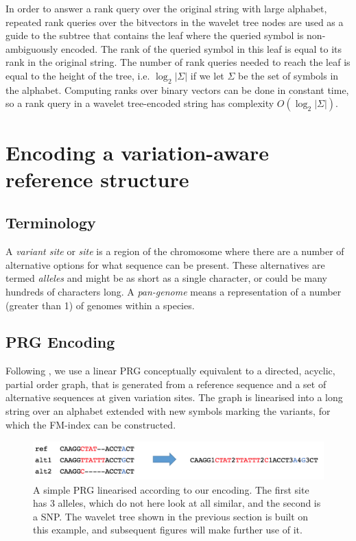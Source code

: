 \documentclass[runningheads,a4paper]{llncs}
\begin{document}
In order to answer a rank query over the original string with large alphabet, repeated rank queries over the bitvectors in the wavelet tree nodes are used as a guide to the  subtree that contains the leaf where the queried symbol is non-ambiguously encoded. The rank of the queried symbol in this leaf is equal to its rank in the original string. The number of rank queries needed to reach the leaf is equal to the height of the tree, i.e. $\log_{2} {|\Sigma|}$ if we let $\Sigma$ be the set of symbols in the alphabet. Computing ranks over binary vectors can be done in constant time, so a rank query in a wavelet tree-encoded string has complexity $O(\log_{2} {|\Sigma|})$. 

\section{Encoding a variation-aware reference structure}

\subsection{Terminology}
A \textit{variant site} or \textit{site} is a region of the chromosome where there are a number of alternative options for what sequence can be present.
These alternatives are termed \textit{alleles} and might be as short as a single character, or could be many hundreds of characters long. A  \textit{pan-genome} means a representation of a number (greater than 1) of genomes within a species. 

\subsection{PRG Encoding}



Following \cite{dilthey}, we use a linear PRG conceptually equivalent to a directed, acyclic, partial order graph, that is generated from a reference sequence and a set of alternative sequences at given variation sites. The graph is linearised into a long string over an alphabet extended with new symbols marking the variants, for which the FM-index can be constructed. 


\begin{figure}
\centering
\includegraphics[height=1.5cm]{linPRG}
\caption{A simple PRG linearised according to our encoding. The first site has 3 alleles, which do not here look at all similar, and the second is a SNP. The wavelet tree shown in the previous section is built on this example, and subsequent figures will make further use of it.}
\label{lab}
\end{figure}
\end{document}
